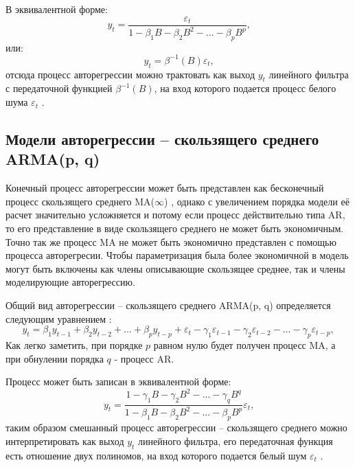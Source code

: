 \documentclass[a4paper,14pt,russian]{extreport}
\begin{document}
В эквивалентной форме:
\begin{equation}
	y_t = \frac{\varepsilon_t}{1 - \beta_1 B - \beta_2 B^2 - ... - \beta_p B^p} \text{,} 
\end{equation}
или:
\begin{equation}
	y_t = \beta^{-1}(B)\varepsilon_t \text{,}
\end{equation}
отсюда процесс авторегрессии можно трактовать как выход $y_t$ линейного 
фильтра с передаточной функцией $\beta^{-1}(B)$, на вход которого подается 
процесс белого шума $\varepsilon_t$ \cite{box2008}. 


\subsection{Модели авторегрессии -- скользящего среднего ARMA(p, q)}
Конечный процесс авторегрессии может быть представлен как бесконечный 
процесс скользящего среднего MA($\infty$) \cite{hamilton1994, chatfield2000}, 
однако с увеличением порядка модели её расчет значительно усложняется и 
потому если процесс действительно типа AR, то его представление в виде 
скользящего среднего не может быть экономичным. Точно так же процесс MA не 
может быть экономично представлен с помощью процесса авторегресии. Чтобы 
параметризация была более экономичной в модель могут быть включены как 
члены описывающие скользящее среднее, так и члены моделирующие 
авторегрессию.

Общий вид авторегрессии -- скользящего среднего ARMA(p, q) определяется 
следующим уравнением \cite{runova2013}:
\begin{equation}
	y_t = \beta_1 y_{t-1} + \beta_2 y_{t-2} + ... + \beta_p y_{t-p} + \varepsilon_t 
		- \gamma_1 \varepsilon_{t-1} - \gamma_2 \varepsilon_{t-2}  - ... 
		- \gamma_p \varepsilon_{t-p}, 
\end{equation}
Как легко заметить, при порядке $p$ равном нулю будет получен процесс MA, 
а при обнулении порядка $q$ - процесс AR. 

Процесс  может быть записан в эквивалентной форме:
\begin{equation}
	y_t = \frac
		{1 - \gamma_1 B - \gamma_2 B^2 - ... - \gamma_q B^q}
		{1 - \beta_1 B - \beta_2 B^2 - ... - \beta_p B^p}  \varepsilon_t \text{,} 
\end{equation}
таким образом смешанный процесс авторегрессии -- скользящего среднего 
можно интерпретировать как выход $y_t$ линейного фильтра, его передаточная 
функция есть отношение двух полиномов, на вход которого подается белый шум 
$\varepsilon_t$ \cite{box2008}. 
 
\end{document}
